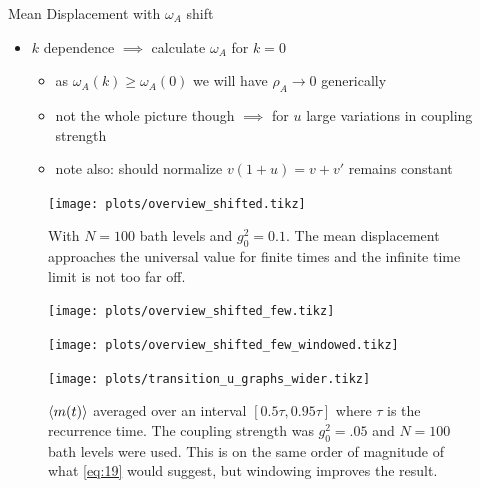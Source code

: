 \documentclass[10pt, aspectratio=169]{beamer}
\begin{document}
\begin{frame}{Mean Displacement with \(ω_{A}\) shift}
  \begin{itemize}
  \item \(k\) dependence \(\implies\) calculate \(ω_{A}\) for \(k=0\)
    \begin{itemize}
    \item as \(ω_{A}(k)≥ω_{A}(0)\) we will have \(ρ_{A}\to 0\)
      generically
    \item not the whole picture though \(\implies\) for \(u\) large
      variations in coupling strength
    \item note also: should normalize \(v (1+u) = v + v\prime\)
      remains constant
    \end{itemize}
  \end{itemize}
\end{frame}

\begin{frame}
    \begin{figure}
    \centering
    \texttt{[image: plots/overview\_shifted.tikz]}
    \caption{\label{fig:overview_shifted_many} With \(N=100\)
      bath levels and \(g_{0}^{2}=0.1\). The mean displacement approaches the universal
      value for finite times and the infinite time limit is not
      too far off.}
  \end{figure}
\end{frame}


\begin{frame}
    \begin{figure}
    \centering
    \texttt{[image: plots/overview\_shifted\_few.tikz]}
  \end{figure}
\end{frame}

\begin{frame}
    \begin{figure}
    \centering
    \texttt{[image: plots/overview\_shifted\_few\_windowed.tikz]}
  \end{figure}
\end{frame}

\begin{frame}
  \begin{figure}[H]
  \centering
  \texttt{[image: plots/transition\_u\_graphs\_wider.tikz]}
  \caption{\label{fig:transition_u_graphs.tikz} \(\ev{m(t)}\)
    averaged over an interval \([0.5τ, 0.95τ]\) where \(τ\) is the
    recurrence time. The coupling strength was \(g_{0}^{2}=.05\) and
    \(N=100\) bath levels were used. This is on the same order of
    magnitude of what \cref{eq:19} would suggest, but windowing
    improves the result.}
\end{figure}
\end{frame}
\end{document}
